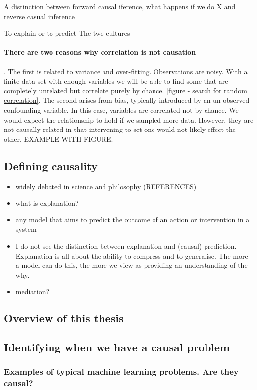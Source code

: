 \documentclass[11pt,a4paper,oneside]{book}
\theoremstyle{plain}
\theoremstyle{definition}
\begin{document}
A distinction between forward causal iference, what happens if we do X and reverse casual inference 

To explain or to predict \cite{Shmueli2010}
The two cultures \cite{Breiman2001}

\paragraph*{There are two reasons why correlation is not causation}. The first is related to variance and over-fitting. Observations are noisy. With a finite data set with enough variables we will be able to find some that are completely unrelated but correlate purely by chance. \ref{figure - search for random correlation}. The second arises from bias, typically introduced by an un-observed confounding variable. In this case, variables are correlated not by chance. We would expect the relationship to hold if we sampled more data. However, they are not causally related in that intervening to set one would not likely effect the other. EXAMPLE WITH FIGURE. 

\subsection{Defining causality}
\begin{itemize}
\item widely debated in science and philosophy (REFERENCES)
\item what is explanation?
\item any model that aims to predict the outcome of an action or intervention in a system
\item I do not see the distinction between explanation and (causal) prediction. Explanation is all about the ability to compress and to generalise. The more a model can do this, the more we view as providing an understanding of the why. 
\item mediation?
\end{itemize}
\subsection{Overview of this thesis}
\subsection{Identifying when we have a causal problem}

\subsubsection{Examples of typical machine learning problems. Are they causal?}
\end{document}
